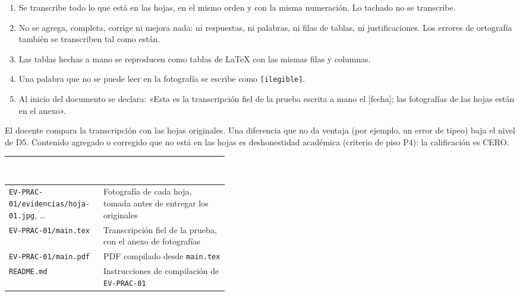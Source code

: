 \documentclass[11pt]{article}
\newcommand{\thdr}[1]{\cellcolor{utegreen}\textcolor{white}{\textbf{#1}}}
\begin{document}
\begin{cajaaviso}[title={Reglas de la transcripción fiel}]
	\begin{enumerate}[label=\textbf{R\arabic*.},leftmargin=24pt,itemsep=2pt]
		\item Se transcribe todo lo que está en las hojas, en el mismo orden y con la misma numeración. Lo tachado no se transcribe.
		\item No se agrega, completa, corrige ni mejora nada: ni respuestas, ni palabras, ni filas de tablas, ni justificaciones. Los errores de ortografía también se transcriben tal como están.
		\item Las tablas hechas a mano se reproducen como tablas de \LaTeX{} con las mismas filas y columnas.
		\item Una palabra que no se puede leer en la fotografía se escribe como \texttt{[ilegible]}.
		\item Al inicio del documento se declara: «Esta es la transcripción fiel de la prueba escrita a mano el [fecha]; las fotografías de las hojas están en el anexo».
	\end{enumerate}
	El docente compara la transcripción con las hojas originales. Una diferencia que no da ventaja (por ejemplo, un error de tipeo) baja el nivel de D5. Contenido agregado o corregido que no está en las hojas es deshonestidad académica (criterio de piso P4): la calificación es CERO.
\end{cajaaviso}

\noindent\begin{minipage}{\linewidth}
{\small
\noindent\begin{tabularx}{\linewidth}{|L{0.43\linewidth}|Y|}
	\hline
	\thdr{Ruta en el repositorio} & \thdr{Contenido}\\
	\hline
	\texttt{EV-PRAC-01/\allowbreak{}evidencias/\allowbreak{}hoja-01.jpg}, \ldots & Fotografía de cada hoja, tomada antes de entregar los originales\\
	\hline
	 \texttt{EV-PRAC-01/main.tex} & Transcripción fiel de la prueba, con el anexo de fotografías\\
	\hline
	\texttt{EV-PRAC-01/main.pdf} & PDF compilado desde \texttt{main.tex}\\
	\hline
	 \texttt{README.md} & Instrucciones de compilación de \texttt{EV-PRAC-01}\\
	\hline
\end{tabularx}
}
\end{minipage}
\end{document}
